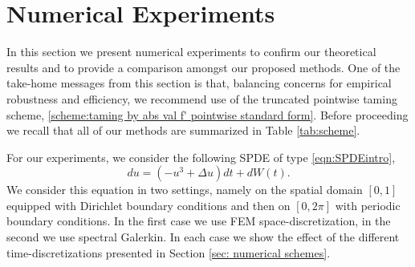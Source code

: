 \documentclass[reqno, 11pt]{amsart}
\theoremstyle{plain}
\theoremstyle{definition}
\theoremstyle{remark}
\numberwithin{equation}{section}
\numberwithin{theorem}{section}
\begin{document}
{\section{Numerical Experiments}\label{sec: numerics}

In this section we present numerical experiments to confirm our theoretical results and to provide a comparison amongst our proposed methods. One of the take-home messages from this section is that,   balancing concerns for empirical robustness and efficiency, we recommend use of the truncated pointwise taming scheme, \eqref{scheme:taming by abs val f' pointwise standard form}. Before proceeding we recall that all of our methods are summarized in Table \ref{tab:scheme}. 


For our experiments, we consider the following  SPDE of type \eqref{eqn:SPDEintro}, 
\begin{equation}
\label{e:testspde1}
    du = (- u^3  + \Delta u) dt  + dW(t).
\end{equation}
{We consider this equation in two settings, namely on the spatial domain $[0,1]$ equipped with Dirichlet boundary conditions and then on $[0,2\pi]$ with periodic boundary conditions. In the first case we use FEM space-discretization, in the second we use spectral Galerkin. In each case we show the effect of the different time-discretizations presented in Section \ref{sec: numerical schemes}.    
}





}
\end{document}
